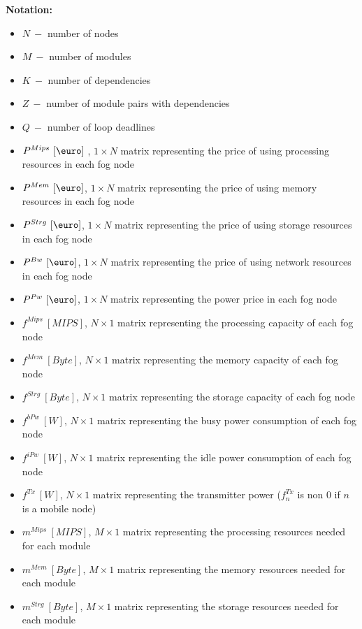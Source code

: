 \documentclass{article}
\begin{document}
\newcommand{\SubItem}[1]{
    {\setlength\itemindent{15pt} \item[-] #1}
}

\noindent\textbf{Notation:}
\begin{itemize}
	\item $N~-$ number of nodes
	\item $M~-$ number of modules
	\item $K~-$ number of dependencies
	\item $Z~-$ number of module pairs with dependencies
	\item $Q~-$ number of loop deadlines\\
	
	\item $P^{Mips}~[\mbox{\euro}]~$, $1\times N$ matrix representing the price of using processing resources in each fog node
	\item $P^{Mem}~[\mbox{\euro}]$, $1\times N$ matrix representing the price of using memory resources in each fog node
	\item $P^{Strg}~[\mbox{\euro}]$, $1\times N$ matrix representing the price of using storage resources in each fog node
	\item $P^{Bw}~[\mbox{\euro}]$, $1\times N$ matrix representing the price of using network resources in each fog node
	\item $P^{Pw}~[\mbox{\euro}]$, $1\times N$ matrix representing the power price in each fog node\\
	
	\item $f^{Mips}~[MIPS]$, $N\times 1$ matrix representing the processing capacity of each fog node
	\item $f^{Mem}~[Byte]$, $N\times 1$ matrix representing the memory capacity of each fog node
	\item $f^{Strg}~[Byte]$, $N\times 1$ matrix representing the storage capacity of each fog node
	\item $f^{bPw}~[W]$, $N\times 1$ matrix representing the busy power consumption of each fog node
	\item $f^{iPw}~[W]$, $N\times 1$ matrix representing the idle power consumption of each fog node
	\item $f^{Tx}~[W]$, $N\times 1$ matrix representing the transmitter power ($f^{Tx}_n$ is non 0 if $n$ is a mobile node)\\
	
	\item $m^{Mips}~[MIPS]$, $M\times 1$ matrix representing the processing resources needed for each module
	\item $m^{Mem}~[Byte]$, $M\times 1$ matrix representing the memory resources needed for each module
	\item $m^{Strg}~[Byte]$, $M\times 1$ matrix representing the storage resources needed for each module\\
	

\end{itemize}
\end{document}
